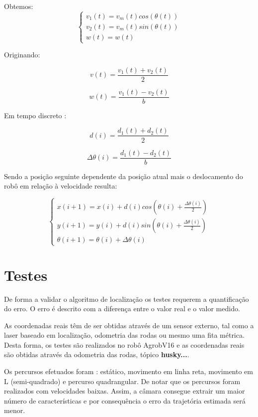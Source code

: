 Obtemos:
\[ \left\{\begin{array}{ccc}
	v_1(t) = v_m(t) cos( \theta(t))\\ 
	v_2(t) = v_m(t) sin( \theta(t))\\ 
	w(t) = w(t)
\end{array}\right. \]

Originando: 

\[ v(t) = \frac{v_1(t)+v_2(t)}{2} \]

\[  w(t) = \frac{v_1(t)-v_2(t)}{b} \]

Em tempo discreto :

\[ d(i) = \frac{d_1(t)+d_2(t)}{2} \]

\[ \Delta \theta (i) = \frac{d_1(t)-d_2(t)}{b} \]

Sendo a posição seguinte dependente da posição atual mais o deslocamento do robô em relação à velocidade resulta:

\[ \left\{\begin{array}{ccc}
x(i+1) = x(i) + d(i) cos( \theta(i) + \frac{\Delta \theta(i)}{2})\\ 
y(i+1) = y(i) + d(i) sin( \theta(i) + \frac{\Delta \theta(i)}{2})\\ 
\theta (i+1) = \theta (i) + \Delta \theta (i)
\end{array}\right. \]


\section{Testes}

De forma a validar o algoritmo de localização os testes requerem a quantificação do erro. O erro é descrito com a diferença entre o valor real e o valor medido.

As coordenadas reais têm de ser obtidas através de um sensor externo, tal como a laser baseado em localização, odometria das rodas ou mesmo uma fita métrica. Desta forma, os testes são realizados no robô AgrobV16 e as coordenadas reais são obtidas através da odometria das rodas, tópico \textbf{husky...}. 


Os percursos efetuados foram : estático, movimento em linha reta, movimento em L (semi-quadrado) e percurso quadrangular. De notar que os percursos foram realizados com velocidades baixas. Assim, a câmara consegue extrair um maior número de características e por consequência o erro da trajetória estimada será menor.  

